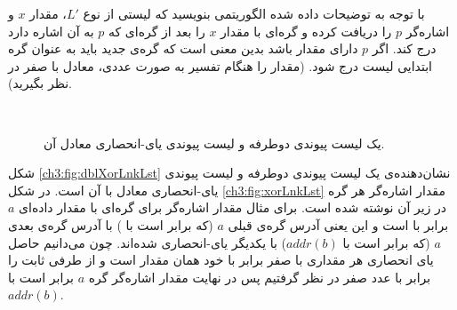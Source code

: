 با توجه به توضیحات داده شده الگوریتمی بنویسید که لیستی از نوع {$L'$}، مقدار {$x$} و اشاره‌گر {$p$} را دریافت کرده و گره‌ای با مقدار {$x$} را بعد از گره‌ای که {$p$} به آن اشاره دارد درج کند. اگر  {$p$} دارای مقدار {} باشد بدین معنی است که گره‌ی جدید باید به عنوان گره ابتدایی لیست درج شود. (مقدار {} را هنگام تفسیر به صورت عددی، معادل با صفر در نظر بگیرید).


\begin{figure}
\begin{center}
\\[0.7cm]
\caption{یک لیست پیوندی دوطرفه و لیست پیوندی یای-انحصاری معادل آن.}\label{ch3:fig:dblXorLnkLst}
\end{center}
\end{figure}

شکل {\eqref{ch3:fig:dblXorLnkLst}} نشان‌دهنده‌ی یک لیست پیوندی دوطرفه و لیست پیوندی یای-انحصاری معادل با آن است. در شکل {\eqref{ch3:fig:xorLnkLst}} مقدار اشاره‌گر {} هر گره در زیر آن نوشته شده است. برای مثال مقدار اشاره‌گر {} برای گره‌ای با مقدار داده‌ای {$a$} برابر با {} است و این یعنی آدرس گره‌ی قبلی {$a$} (که برابر است با {}) با آدرس گره‌ی بعدی {$a$} (که برابر است با {$\mathit{addr}(b)$}) با یکدیگر یای-انحصاری شده‌اند. چون می‌دانیم حاصل یای انحصاری هر مقداری با صفر برابر با خود همان مقدار است و از طرفی ثابت {} را برابر با عدد صفر در نظر گرفتیم پس در نهایت مقدار اشاره‌گر {} گره {$a$} برابر است با {$\mathit{addr}(b)$}.

